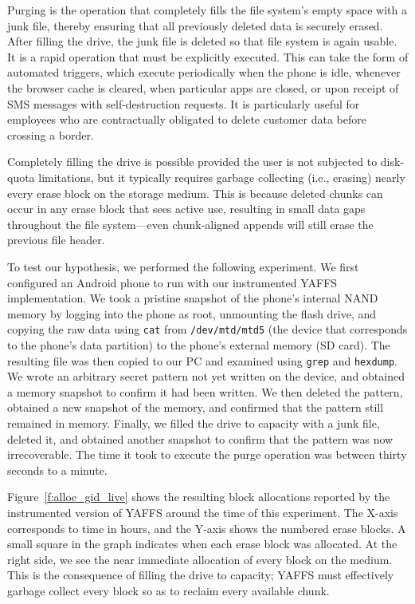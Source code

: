 \documentclass{acmtog}
\begin{document}
Purging is the operation that completely fills the file system's empty space
with a junk file, thereby ensuring that all
previously deleted data is securely erased. After filling the drive, the
junk file is deleted so that file system is again usable.
It is a rapid
operation that must be explicitly executed. This can take the form of automated
triggers,  which execute periodically when the phone is idle, whenever the browser cache is cleared, when particular apps are
closed, or upon receipt of SMS messages with self-destruction requests. It
is particularly useful for employees who are contractually obligated to delete
customer data before crossing a border. 


Completely filling the drive is possible
provided the user is not subjected to disk-quota limitations, but it typically requires
garbage collecting (i.e., erasing) nearly
every erase block on the storage medium. This is because deleted chunks can occur
in any erase block that sees active use, resulting in small data gaps
throughout the file system---even chunk-aligned appends will
still erase the previous file header.

To test our hypothesis, we performed the following experiment.
We first configured an Android phone to run with our instrumented YAFFS implementation. 
We took a pristine snapshot of the phone's internal NAND memory by logging
into the phone as root,
unmounting the flash drive, and copying the raw data using \texttt{cat} from
\texttt{/dev/mtd/mtd5} (the device that corresponds to the phone's data partition) 
to the phone's external memory (SD card). The resulting file was then
copied to our PC and examined using \texttt{grep} and \texttt{hexdump}. We
wrote an arbitrary secret pattern not yet written on the device, and
obtained a memory snapshot to confirm it had been written.
We then deleted the pattern, obtained a new snapshot of the memory, and confirmed that the pattern
still remained in memory. Finally, we filled the drive to capacity with a junk
file, deleted it, and obtained
another snapshot to confirm that the pattern was now irrecoverable. The time it
took to execute the purge operation was between thirty seconds to a minute.


Figure~\ref{f:alloc_gid_live} 
shows the resulting block allocations reported by the instrumented version
of YAFFS around the time of this experiment. The X-axis corresponds to
time in hours, and the Y-axis shows the numbered erase blocks.
A small square in the graph indicates when each erase block was allocated.
At the right side, we see
the near immediate allocation of every block on the medium. This is
the consequence of filling the drive to capacity; 
YAFFS must effectively garbage collect every block 
so as to reclaim every available chunk.
\end{document}
